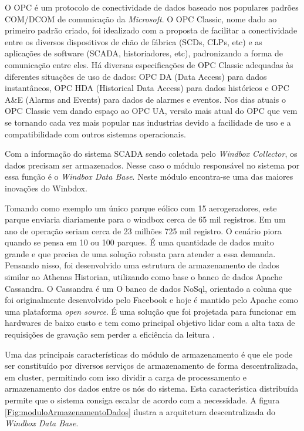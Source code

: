 O OPC é um protocolo de conectividade de dados baseado nos populares padrões COM/DCOM de comunicação da \textit{Microsoft}. O OPC Classic, nome dado ao primeiro padrão criado, foi idealizado com a proposta de facilitar a conectividade entre os diversos dispositivos de chão de fábrica (SCDs, CLPs, etc) e as aplicações de software (SCADA, historiadores, etc), padronizando a forma de comunicação entre eles. Há diversas especificações de OPC Classic adequadas às diferentes situações de uso de dados: OPC DA (Data Access) para dados instantâneos, OPC HDA (Historical Data Access) para dados históricos e OPC A\&E (Alarms and Events) para dados de alarmes e eventos. Nos dias atuais o OPC Classic vem dando espaço ao OPC UA, versão mais atual do OPC que vem se tornando cada vez mais popular nas industrias devido a facilidade de uso e a compatibilidade com outros sistemas operacionais.

Com a informação do sistema SCADA sendo coletada pelo \textit{Windbox Collector}, os dados precisam ser armazenados. Nesse caso o módulo responsável no sistema por essa função é o \textit{Windbox Data Base}. Neste módulo encontra-se uma das maiores inovações do Winbdox.

Tomando como exemplo um único parque eólico com 15 aerogeradores, este parque enviaria diariamente para o windbox cerca de 65 mil registros. Em um ano de operação seriam cerca de 23 milhões 725 mil registro. O cenário piora quando se pensa em 10 ou 100 parques. É uma quantidade de dados muito grande e que precisa de uma solução robusta para atender a essa demanda. Pensando nisso, foi desenvolvido uma estrutura de armazenamento de dados similar ao Athenas Historian, utilizando como base o banco de dados Apache Cassandra. O Cassandra é um O banco de dados NoSql, orientado a coluna que foi originalmente desenvolvido pelo Facebook e hoje é mantido pelo Apache como uma plataforma \textit{open source}. É uma solução que foi projetada para funcionar em hardwares de baixo custo e tem como principal objetivo lidar com a alta taxa de requisições de gravação sem perder a eficiência da leitura \cite{cassandra-banco-dados}.

Uma das principais características do módulo de armazenamento é que ele pode ser constituído por diversos serviços de armazenamento de forma descentralizada, em cluster, permitindo com isso dividir a carga de processamento e armazenamento dos dados entre os nós do sistema. Esta característica distribuída permite que o sistema consiga escalar de acordo com a necessidade. A figura \ref{Fig:moduloArmazenamentoDados} ilustra a arquitetura descentralizada do \textit{Windbox Data Base}.

